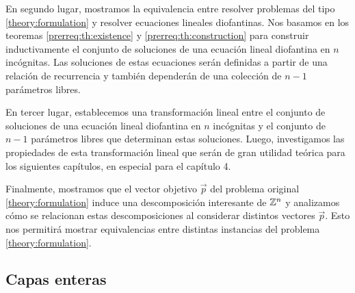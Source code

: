 En segundo lugar, mostramos la equivalencia entre resolver problemas del tipo
\eqref{theory:formulation} y resolver ecuaciones lineales diofantinas. Nos basamos en los teoremas
\ref{prerreq:th:existence} y \ref{prerreq:th:construction} para construir inductivamente el conjunto
de soluciones de una ecuación lineal diofantina en $n$ incógnitas. Las soluciones de estas
ecuaciones serán definidas a partir de una relación de recurrencia y también dependerán de una
colección de $n - 1$ parámetros libres.

En tercer lugar, establecemos una transformación lineal entre el conjunto de soluciones de una ecuación
lineal diofantina en $n$ incógnitas y el conjunto de $n - 1$ parámetros libres que determinan estas
soluciones. Luego, investigamos las propiedades de esta transformación lineal que serán de gran utilidad
teórica para los siguientes capítulos, en especial para el capítulo 4.

Finalmente, mostramos que el vector objetivo $\vec{p}$ del problema original
\eqref{theory:formulation} induce una descomposición interesante de $\mathbb{Z}^n$ y analizamos cómo se
relacionan estas descomposiciones al considerar distintos vectores $\vec{p}$. Esto nos permitirá
mostrar equivalencias entre distintas instancias del problema \eqref{theory:formulation}.

\subsection{Capas enteras}
\label{subsec:sym}


